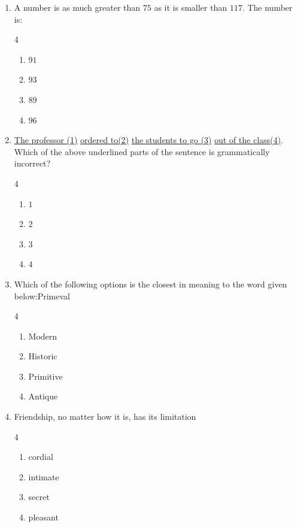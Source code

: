 \documentclass[journal]{IEEEtran}
\theoremstyle{remark}
\begin{document}
\begin{enumerate}
\item   A number is as much greater than $75$ as it is smaller than $117$. The number is:
\hfill{}

\begin {multicols}{4}
\begin{enumerate}
\item   $91$
\item    $93$
\item  $ 89 $
\item $ 96 $
\end{enumerate}
\end{multicols}
\item   \underline{The professor (1)} \underline{ordered to(2)} \underline{the students to go (3)} \underline{out of the class(4)}.
Which of the above underlined parts of the sentence is grammatically incorrect? 

\hfill{}

\begin {multicols}{4}
\begin{enumerate}
\item   $1$
\item   $2$
\item   $3$
\item   $4$
\end{enumerate}
\end{multicols}

\item   Which of the following options is the closest in meaning to the word given below:Primeval
\hfill{}

\begin {multicols}{4}
\begin{enumerate}
\item  Modern
\item   Historic 
\item  Primitive
\item Antique
\end{enumerate}
\end{multicols}
\item   Friendship, no matter how \underline {\hspace{2cm}}it is, has its limitation
\hfill{}

\begin {multicols}{4}
\begin{enumerate}
\item  cordial 
\item  intimate
\item secret 
\item  pleasant 
\end{enumerate}
\end{multicols}


\end{enumerate}
\end{document}
